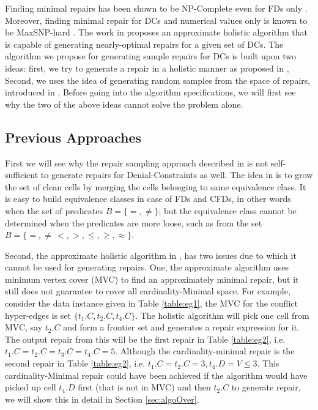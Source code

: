 Finding minimal repairs has been shown to be NP-Complete even for FDs only \cite {Chiang}.
Moreover, finding minimal repair for DCs and numerical values only is known to be MaxSNP-hard \cite{Bertossi}.
The work in \cite{XuChu} proposes an approximate holistic algorithm that is capable of generating nearly-optimal repairs for a given set of DCs.
The algorithm we propose for generating sample repairs for DCs is built upon two ideas: first, we try to generate a repair in a holistic manner as proposed in \cite{XuChu}, Second, we uses the
idea of generating random samples from the space of repairs, introduced in \cite{Beskales_sampling}.
Before going into the algorithm specifications, we will first see why the two of the above ideas cannot solve the problem alone.

\subsection{Previous Approaches} \label{sec:previous}
First we will see why the repair sampling approach described in \cite{Beskales_sampling} is not self-sufficient to generate repairs for Denial-Constraints as well.
The idea in \cite{Beskales_sampling} is to grow the set of clean cells by merging the cells belonging to same equivalence class.
It is easy to build equivalence classes in case of FDs and CFDs, in other words when the set of predicates $B = \{ =, \neq\}$; 
but the equivalence class cannot be determined when the predicates are more loose, such as from the set $B = \{ =, \neq\, <, >, \leq, \geq, \approx \}$.

Second, the approximate holistic algorithm in \cite{XuChu}, has two issues due to which it cannot be used for generating repairs.
One, the approximate algorithm uses minimum vertex cover (MVC) to find an approximately minimal repair, but it still does not guarantee to cover all cardinality-Minimal space.
For example, consider the data instance given in  Table \ref{table:eg1}, the MVC for the conflict hyper-edges is set $\{t_1.C, t_2.C, t_4.C\}$.
The holistic algorithm will pick one cell from MVC, say $t_2.C$ and form a frontier set and generates a repair expression for it.
The output repair from this will be the first repair in Table \ref{table:eg2}, i.e. $t_1.C = t_2.C = t_3.C = t_4.C = 5$.
Although the cardinality-minimal repair is the second repair in Table \ref{table:eg2}, i.e. $t_1.C = t_2.C = 3,t_4.D = V \leq 3$.
This cardinality-Minimal repair could have been achieved if the algorithm would have picked up cell $t_4.D$ first (that is not in MVC) and then $t_2.C$ to generate repair, we will show this in detail in Section \ref{sec:algoOver}.

